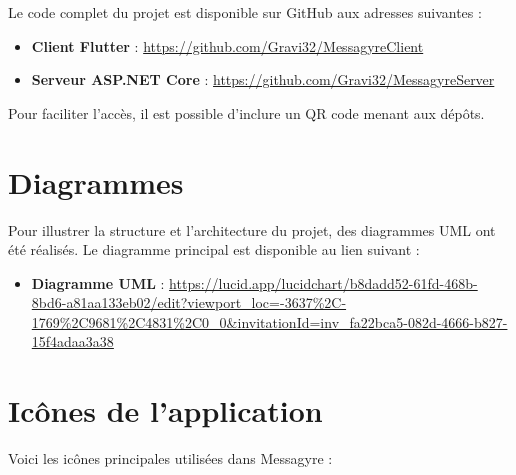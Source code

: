 \documentclass[12pt]{report}
\begin{document}
Le code complet du projet est disponible sur GitHub aux adresses suivantes :

\begin{itemize}
	\item \textbf{Client Flutter} : \url{https://github.com/Gravi32/MessagyreClient}
	\item \textbf{Serveur ASP.NET Core} : \url{https://github.com/Gravi32/MessagyreServer}
\end{itemize}

Pour faciliter l’accès, il est possible d’inclure un QR code menant aux dépôts.

\section{Diagrammes}

Pour illustrer la structure et l’architecture du projet, des diagrammes UML ont été réalisés. Le diagramme principal est disponible au lien suivant :

\begin{itemize}
	\item \textbf{Diagramme UML} : \url{https://lucid.app/lucidchart/b8dadd52-61fd-468b-8bd6-a81aa133eb02/edit?viewport_loc=-3637\%2C-1769\%2C9681\%2C4831\%2C0_0&invitationId=inv_fa22bca5-082d-4666-b827-15f4adaa3a38}
\end{itemize}

\section{Icônes de l’application}

Voici les icônes principales utilisées dans Messagyre :
\end{document}
